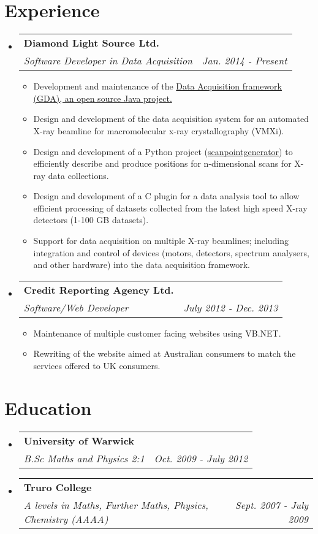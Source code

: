 \documentclass[11pt]{article}
\makeatletter
\newcommand{\cvheading}[3]{
    \begin{tabular*}{0.9\textwidth}[t]{l@{\extracolsep{\fill}}r}
        \textbf{#1}\\
        \textit{#2} & \textit{#3}\\
    \end{tabular*}\vspace{-5pt}
}
\newcommand{\cvitem}[1]{\item #1\vspace{-3pt}}
\makeatother
\begin{document}
\section{Experience}
\begin{itemize}
    \item
        \cvheading
            {Diamond Light Source Ltd.}
            {Software Developer in Data Acquisition}{Jan. 2014 - Present}
            \begin{itemize}
            \cvitem
                {Development and maintenance of the
                \href{https://github.com/openGDA}{Data Acquisition framework (GDA), an open source Java project.}}
            \cvitem
                {Design and development of the data acquisition system for an automated X-ray beamline for
                macromolecular x-ray crystallography (VMXi).}
            \cvitem
            {Design and development of a Python project
                (\href{https://github.com/dls-controls/scanpointgenerator}{scanpointgenerator})
                to efficiently describe and produce positions for n-dimensional scans for X-ray data collections.}
            \cvitem
                {Design and development of a C plugin for a data analysis tool to allow efficient processing of datasets
                collected from the latest high speed X-ray detectors (1-100 GB datasets).}
            \cvitem
                {Support for data acquisition on multiple X-ray beamlines; including integration and control of devices
                (motors, detectors, spectrum analysers, and other hardware) into the data acquisition framework.}
            \end{itemize}
    \item
        \cvheading
            {Credit Reporting Agency Ltd.}
            {Software/Web Developer}{July 2012 - Dec. 2013}
            \begin{itemize}
            \cvitem
                {Maintenance of multiple customer facing websites using VB.NET.}
            \cvitem
                {Rewriting of the website aimed at Australian consumers to match the services
                offered to UK consumers.}
            \end{itemize}

\end{itemize}

\section{Education}
\begin{itemize}
    \item
        \cvheading
            {University of Warwick}
            {B.Sc Maths and Physics 2:1}{Oct. 2009 - July 2012}
    \item
        \cvheading
            {Truro College}
            {A levels in Maths, Further Maths, Physics, Chemistry (AAAA)}{Sept. 2007 - July 2009}
\end{itemize}
\end{document}
